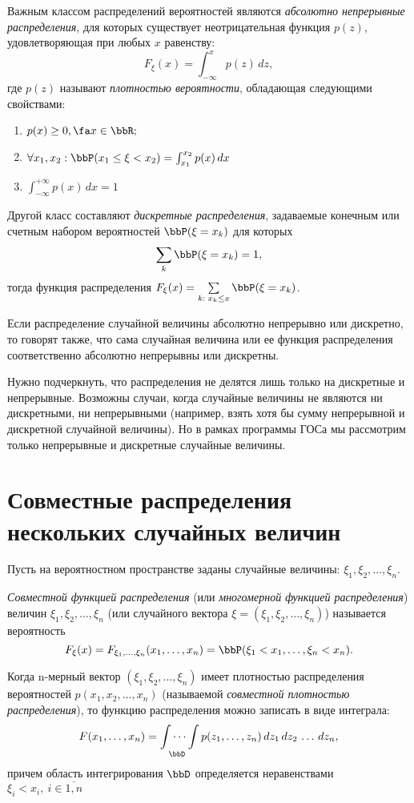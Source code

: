 Важным классом распределений вероятностей являются \textit{абсолютно непрерывные распределения}, для которых существует неотрицательная функция $p(z)$, удовлетворяющая при любых $x$ равенству:
$$F_\xi(x)=\int_{-\infty}^{x}p(z)\,dz,$$ где $p(z)$ называют \textit{плотностью вероятности}, обладающая следующими свойствами:
\begin{enumerate}
\item 
$p(x)\ge 0, \fa x \in \bbR;$ 
\item 
$\forall x_1,x_2: \bbP(x_1\le\xi<x_2)=\int_{x_1}^{x_2}p(x)\,dx$
\item
$\int_{-\infty}^{+\infty}p(x)\,dx=1$
\end{enumerate}

Другой класс составляют \textit{дискретные распределения}, задаваемые конечным или счетным набором вероятностей $\bbP(\xi = x_k)$ для которых
$$
\sum\limits_k \bbP(\xi=x_k)=1,
$$
тогда функция распределения $F_\xi(x)=\sum\limits_{k:\; x_k \le x} \bbP(\xi=x_k)$.

Если распределение случайной величины абсолютно непрерывно или дискретно, то говорят также, что сама случайная величина или ее функция распределения соответственно абсолютно непрерывны или дискретны.

Нужно подчеркнуть, что распределения не делятся лишь только на дискретные и непрерывные. Возможны случаи, когда случайные величины не являются ни дискретными, ни непрерывными (например, взять хотя бы сумму непрерывной и дискретной случайной величины). Но в рамках программы ГОСа мы рассмотрим только непрерывные и дискретные случайные величины. 

\section{Совместные распределения нескольких случайных величин}
Пусть на вероятностном пространстве заданы случайные величины: $\xi_1,\xi_2,\dots,\xi_n$.
\begin{defn}
\textit{Совместной функцией распределения} (или\textit{ многомерной функцией распределения}) величин $\xi_1,\xi_2,\dots,\xi_n$ (или случайного вектора $\xi = (\xi_1,\xi_2,\dots,\xi_n)$) называется вероятность 
$$
F_\xi(x)=F_{\xi_1,\dots,\xi_n}(x_1,\dots,x_n)=\bbP(\xi_1 < x_1,\dots,\xi_n<x_n).
$$
\end{defn}

Когда n-мерный вектор $(\xi_1,\xi_2,\dots,\xi_n)$ имеет плотностью распределения вероятностей $p(x_1,x_2,\dots,x_n)$ (называемой \textit{совместной плотностью распределения}), то функцию распределения можно записать в виде интеграла:
$$
F(x_1,\dots,x_n)=\idotsint\limits_\bbD p(z_1,\dots,z_n)\,dz_1\,dz_2\,\dots\,dz_n,
$$
причем область интегрирования $\bbD$ определяется неравенствами $\xi_i<x_i,\ i\in \overline{1,n}$

